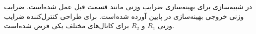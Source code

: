 \documentclass{CCI2020}
\begin{document}
		
		در شبیه‌سازی برای بهینه‌سازی ضرایب وزنی مانند قسمت قبل عمل شده‌است. ضرایب وزنی خروجی بهینه‌سازی در پایین آورده شده‌است. برای طراحی کنترل‌کننده
		ضرایب وزنی
		$R_1$
		و
		$R_2$
		برای کانال‌های مختلف یکی فرض شده‌است.
		
\end{document}
